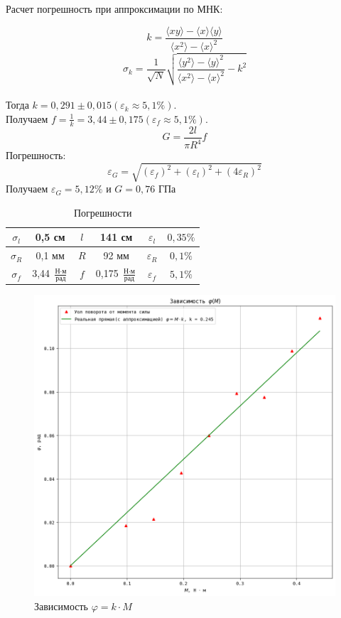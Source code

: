 \documentclass[a4paper]{article}
\begin{document}
Расчет погрешность при аппроксимации по МНК:

\[k=\frac{\langle xy\rangle-\langle x\rangle \langle y\rangle}{\langle x^2\rangle - \langle x\rangle^2}\]
\[\sigma_{k} = \frac{1}{\sqrt{N}}\sqrt{\frac{\langle y^2 \rangle - \langle y \rangle ^2}{\langle x^2 \rangle - \langle x \rangle ^2} - k^2}\]\\
Тогда $k = 0,291 \pm 0,015 (\varepsilon_{k} \approx 5,1\%)$.\\
Получаем $f = \frac{1}{k} = 3,44 \pm 0,175 (\varepsilon_{f} \approx 5,1\%)$.
\[
    G=\frac{2l}{\pi R^{4}}f
\]
Погрешность:
\[
    \varepsilon_{G} = \sqrt{(\varepsilon_{f})^2 + (\varepsilon_{l})^2 + (4\varepsilon_{R})^2} 
\]
Получаем $\varepsilon_{G} = 5,12\%$ и $G = 0,76$ ГПа

\begin{table}[h!]
\begin{center}
\begin{tabular}{|c|c|c|c|c|c|}
\hline
$\sigma_{l}$ & 0,5 см & $l$ & 141 см    & $\varepsilon_{l}$ & $0,35\%$ \\ \hline
$\sigma_{R}$ & 0,1 мм   & $R$ & 92 мм    & $\varepsilon_{R}$ & $0,1\%$  \\ \hline
$\sigma_{f}$ & 3,44 $\frac{\text{Н$\cdot$м}}{\text{рад}}$ & $f$ & 0,175 $\frac{\text{Н$\cdot$м}}{\text{рад}}$ & $\varepsilon_{f}$ & $5,1\%$ \\ \hline
\end{tabular}
\caption{Погрешности}
\end{center}
\end{table}

\begin{figure}[p]
    \centering
    \includegraphics[scale=0.8]{graphic1.png}
    \caption{Зависимость $\varphi = k \cdot M$}
\end{figure}
\end{document}

